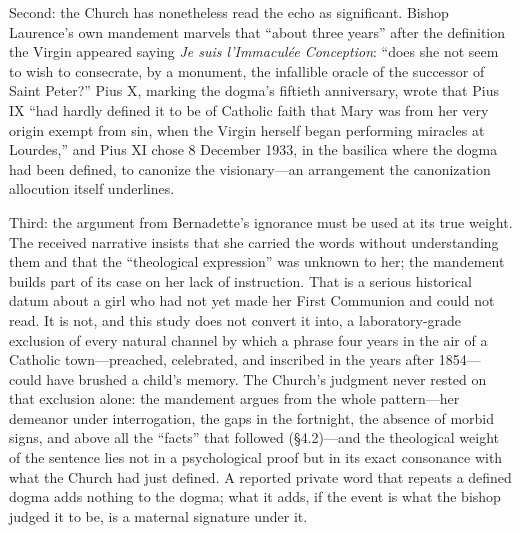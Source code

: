 Second: the Church has nonetheless read the echo as significant.
Bishop Laurence's own mandement marvels that ``about three years''
after the definition the Virgin appeared saying \emph{Je suis
l'Immacul\'ee Conception}: ``does she not seem to wish to
consecrate, by a monument, the infallible oracle of the successor
of Saint Peter?'' Pius X, marking the dogma's fiftieth
anniversary, wrote that Pius IX ``had hardly defined it to be of
Catholic faith that Mary was from her very origin exempt from sin,
when the Virgin herself began performing miracles at Lourdes,'' and
Pius XI chose 8 December 1933, in the basilica where the dogma had
been defined, to canonize the visionary---an arrangement the
canonization allocution itself underlines.

Third: the argument from Bernadette's ignorance must be used at its
true weight. The received narrative insists that she carried the
words without understanding them and that the ``theological
expression'' was unknown to her; the mandement builds part of its
case on her lack of instruction. That is a serious historical
datum about a girl who had not yet made her First Communion and
could not read. It is not, and this study does not convert it
into, a laboratory-grade exclusion of every natural channel by
which a phrase four years in the air of a Catholic town---preached,
celebrated, and inscribed in the years after 1854---could have
brushed a child's memory. The Church's judgment never rested on
that exclusion alone: the mandement argues from the whole
pattern---her demeanor under interrogation, the gaps in the
fortnight, the absence of morbid signs, and above all the
``facts'' that followed (\S4.2)---and the theological weight of
the sentence lies not in a psychological proof but in its exact
consonance with what the Church had just defined. A reported
private word that repeats a defined dogma adds nothing to the
dogma; what it adds, if the event is what the bishop judged it to
be, is a maternal signature under it.

